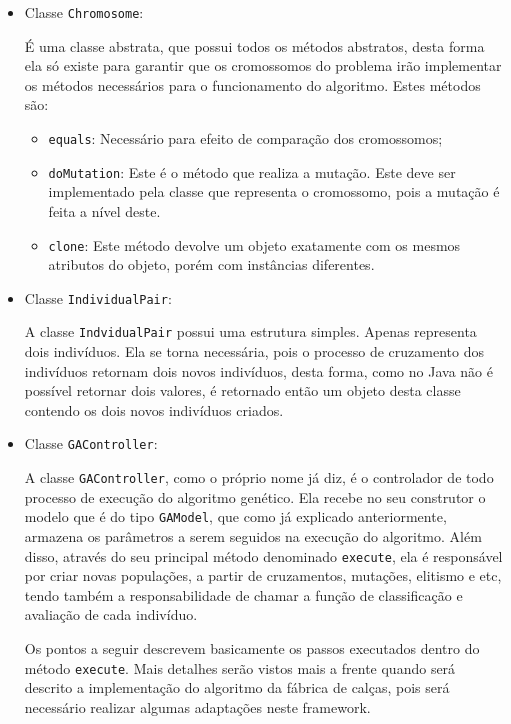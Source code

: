 \begin{itemize}
	\par
	
	\item Classe \texttt{Chromosome}:
	\par É uma classe abstrata, que possui todos os métodos abstratos, desta forma
	ela só existe para garantir que os cromossomos do problema irão implementar os
	métodos necessários para o funcionamento do algoritmo. Estes métodos são:
	
	\begin{itemize}
		
		\item \texttt{equals}: Necessário para efeito de comparação dos cromossomos;
		
		\item \texttt{doMutation}: Este é o método que realiza a mutação. Este deve
		ser implementado pela classe que representa o cromossomo, pois a
		mutação é feita a nível deste.
		
		\item \texttt{clone}: Este método devolve um objeto exatamente com os mesmos
		atributos do objeto, porém com instâncias diferentes.
		
	\end{itemize}
	
	
	\item Classe \texttt{IndividualPair}:
	\par A classe \texttt{IndvidualPair} possui uma estrutura simples. Apenas
	representa dois indivíduos. Ela se torna necessária, pois o processo de
	cruzamento dos indivíduos retornam dois novos indivíduos, desta forma, como 
	no Java não é possível retornar dois valores, é retornado então um objeto desta
	classe contendo os dois novos indivíduos criados. 
	
	
	\item Classe \texttt{GAController}:
	\par A classe \texttt{GAController}, como o próprio nome já diz, é o
	controlador de todo processo de execução do algoritmo genético.
	Ela recebe no seu construtor o modelo que é do tipo \texttt{GAModel}, que como
	já explicado anteriormente, armazena os parâmetros a serem seguidos na
	execução do algoritmo. Além disso, através do seu principal método
	denominado \texttt{execute}, ela é responsável por criar novas populações, a
	partir de cruzamentos, mutações, elitismo e etc, tendo também a
	responsabilidade de chamar a função de classificação e avaliação de cada indivíduo.
	
	\par Os pontos a seguir descrevem basicamente os passos executados dentro do
	método \texttt{execute}. Mais detalhes serão vistos mais a frente quando será
	descrito a implementação do algoritmo da fábrica de calças, pois será necessário 
	realizar algumas adaptações neste framework.
	

\end{itemize}

